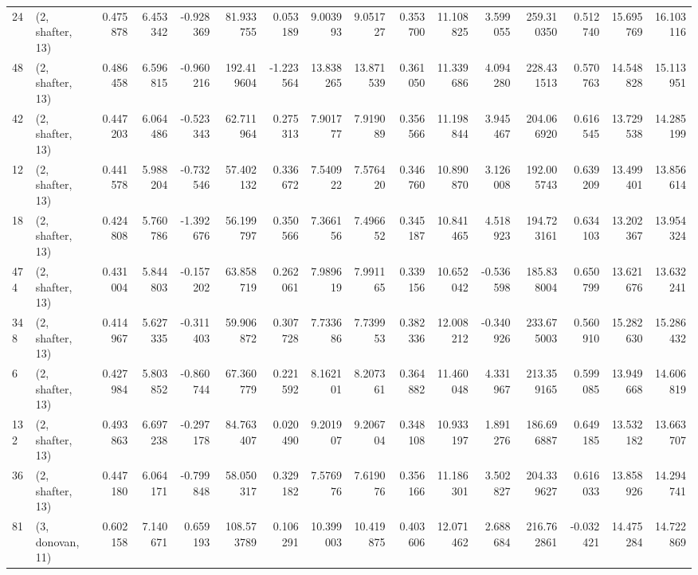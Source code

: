 \begin{tabular}{llrrrrrrrrrrrrrr}
24  &  (2, shafter, 13) &   0.475878 &   6.453342 &  -0.928369 &    81.933755 &   0.053189 &   9.003993 &   9.051727 &  0.353700 &  11.108825 &   3.599055 &   259.310350 &  0.512740 &  15.695769 &  16.103116 \\
48  &  (2, shafter, 13) &   0.486458 &   6.596815 &  -0.960216 &   192.419604 &  -1.223564 &  13.838265 &  13.871539 &  0.361050 &  11.339686 &   4.094280 &   228.431513 &  0.570763 &  14.548828 &  15.113951 \\
42  &  (2, shafter, 13) &   0.447203 &   6.064486 &  -0.523343 &    62.711964 &   0.275313 &   7.901777 &   7.919089 &  0.356566 &  11.198844 &   3.945467 &   204.066920 &  0.616545 &  13.729538 &  14.285199 \\
12  &  (2, shafter, 13) &   0.441578 &   5.988204 &  -0.732546 &    57.402132 &   0.336672 &   7.540922 &   7.576420 &  0.346760 &  10.890870 &   3.126008 &   192.005743 &  0.639209 &  13.499401 &  13.856614 \\
18  &  (2, shafter, 13) &   0.424808 &   5.760786 &  -1.392676 &    56.199797 &   0.350566 &   7.366156 &   7.496652 &  0.345187 &  10.841465 &   4.518923 &   194.723161 &  0.634103 &  13.202367 &  13.954324 \\
474 &  (2, shafter, 13) &   0.431004 &   5.844803 &  -0.157202 &    63.858719 &   0.262061 &   7.989619 &   7.991165 &  0.339156 &  10.652042 &  -0.536598 &   185.838004 &  0.650799 &  13.621676 &  13.632241 \\
348 &  (2, shafter, 13) &   0.414967 &   5.627335 &  -0.311403 &    59.906872 &   0.307728 &   7.733686 &   7.739953 &  0.382336 &  12.008212 &  -0.340926 &   233.675003 &  0.560910 &  15.282630 &  15.286432 \\
6   &  (2, shafter, 13) &   0.427984 &   5.803852 &  -0.860744 &    67.360779 &   0.221592 &   8.162101 &   8.207361 &  0.364882 &  11.460048 &   4.331967 &   213.359165 &  0.599085 &  13.949668 &  14.606819 \\
132 &  (2, shafter, 13) &   0.493863 &   6.697238 &  -0.297178 &    84.763407 &   0.020490 &   9.201907 &   9.206704 &  0.348108 &  10.933197 &   1.891276 &   186.696887 &  0.649185 &  13.532182 &  13.663707 \\
36  &  (2, shafter, 13) &   0.447180 &   6.064171 &  -0.799848 &    58.050317 &   0.329182 &   7.576976 &   7.619076 &  0.356166 &  11.186301 &   3.502827 &   204.339627 &  0.616033 &  13.858926 &  14.294741 \\
81  &  (3, donovan, 11) &   0.602158 &   7.140671 &   0.659193 &   108.573789 &   0.106291 &  10.399003 &  10.419875 &  0.403606 &  12.071462 &   2.688684 &   216.762861 & -0.032421 &  14.475284 &  14.722869 \\

\end{tabular}
